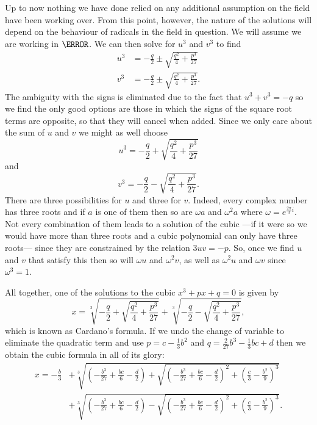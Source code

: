 \documentclass[12pt,oneside]{book}
\begin{document}
Up to now nothing we have done relied on any additional assumption on the field have been working over. From this point, however, the nature of the solutions will depend on the behaviour of radicals in the field in question. We will assume we are working in \( \C \). We can then solve for \( u^3 \) and \( v^3 \) to find
\begin{align*}
	u^3 &= -\frac{q}{2} \pm \sqrt{\frac{q^2}{4} + \frac{p^3}{27}} \\
	v^3 &= -\frac{q}{2} \pm \sqrt{\frac{q^2}{4} + \frac{p^3}{27}}.
\end{align*}
The ambiguity with the signs is eliminated due to the fact that \( u^3 + v^3 = -q \) so we find the only good options are those in which the signs of the square root terms are opposite, so that they will cancel when added. Since we only care about the sum of \( u \) and \( v \) we might as well choose
\begin{equation*}
	u^3 = -\frac{q}{2} + \sqrt{\frac{q^2}{4} + \frac{p^3}{27}}
\end{equation*}
and 
\begin{equation*}
	v^3 = -\frac{q}{2} - \sqrt{\frac{q^2}{4} + \frac{p^3}{27}}.
\end{equation*}
There are three possibilities for \( u \) and three for \( v \). Indeed, every complex number has three roots and if \( a \) is one of them then so are \( \omega a \) and \( \omega^2 a \) where \( \omega = e^{\frac{2\pi}{3}i} \). Not every combination of them leads to a solution of the cubic ---if it were so we would have more than three roots and a cubic polynomial can only have three roots--- since they are constrained by the relation \( 3uv = -p \). So, once we find \( u \) and \( v \) that satisfy this then so will \( \omega u \) and \( \omega^2 v \), as well as \( \omega^2 u \) and \( \omega v \) since \( \omega^3 = 1 \).

All together, one of the solutions to the cubic \( x^3 + px + q = 0 \) is given by
\begin{equation*}
	x = \sqrt[3]{-\frac{q}{2} + \sqrt{\frac{q^2}{4} + \frac{p^3}{27}}} + \sqrt[3]{-\frac{q}{2} - \sqrt{\frac{q^2}{4} + \frac{p^3}{27}}},
\end{equation*}
which is known as Cardano's formula. If we undo the change of variable to eliminate the quadratic term and use \( p = c - \frac{1}{3}b^2 \) and \( q = \frac{2}{27}b^3 - \frac{1}{3}bc + d \) then we obtain the cubic formula in all of its glory:
\begin{align*}
	x = -\frac{b}{3} &+ \sqrt[3]{\left(-\frac{b^3}{27} + \frac{bc}{6} - \frac{d}{2}\right) + \sqrt{\left(-\frac{b^3}{27} + \frac{bc}{6} - \frac{d}{2}\right)^2 + \left(\frac{c}{3} - \frac{b^2}{9}\right)^3}} \\
									 & +\sqrt[3]{\left(-\frac{b^3}{27} + \frac{bc}{6} - \frac{d}{2}\right) - \sqrt{\left(-\frac{b^3}{27} + \frac{bc}{6} - \frac{d}{2}\right)^2 + \left(\frac{c}{3} - \frac{b^2}{9}\right)^3}}.
\end{align*}
\end{document}
